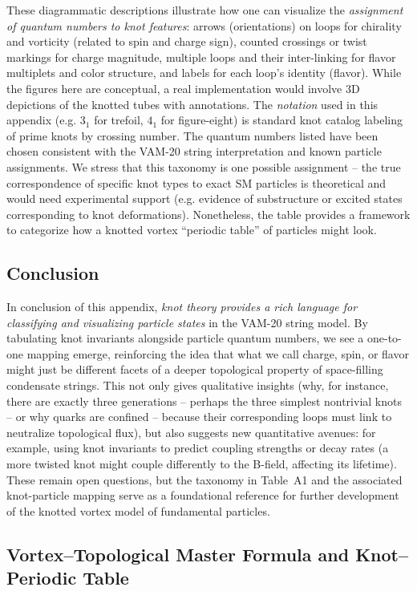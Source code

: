 \documentclass[12pt]{article}
\begin{document}
These diagrammatic descriptions illustrate how one can visualize the \emph{assignment of quantum numbers to knot features}: arrows (orientations) on loops for chirality and vorticity (related to spin and charge sign), counted crossings or twist markings for charge magnitude, multiple loops and their inter-linking for flavor multiplets and color structure, and labels for each loop’s identity (flavor). While the figures here are conceptual, a real implementation would involve 3D depictions of the knotted tubes with annotations. The \emph{notation} used in this appendix (e.g. $3_1$ for trefoil, $4_1$ for figure-eight) is standard knot catalog labeling of prime knots by crossing number\cite{mi.sanu.ac.rs}. The quantum numbers listed have been chosen consistent with the VAM-20 string interpretation and known particle assignments. We stress that this taxonomy is one possible assignment – the true correspondence of specific knot types to exact SM particles is theoretical and would need experimental support (e.g. evidence of substructure or excited states corresponding to knot deformations). Nonetheless, the table provides a framework to categorize how a knotted vortex “periodic table” of particles might look.

\subsection*{Conclusion}
In conclusion of this appendix, \emph{knot theory provides a rich language for classifying and visualizing particle states} in the VAM-20 string model. By tabulating knot invariants alongside particle quantum numbers, we see a one-to-one mapping emerge, reinforcing the idea that what we call charge, spin, or flavor might just be different facets of a deeper topological property of space-filling condensate strings. This not only gives qualitative insights (why, for instance, there are exactly three generations – perhaps the three simplest nontrivial knots – or why quarks are confined – because their corresponding loops must link to neutralize topological flux), but also suggests new quantitative avenues: for example, using knot invariants to predict coupling strengths or decay rates (a more twisted knot might couple differently to the B-field, affecting its lifetime). These remain open questions, but the taxonomy in Table~A1 and the associated knot-particle mapping serve as a foundational reference for further development of the knotted vortex model of fundamental particles.


\subsection{Vortex--Topological Master Formula and Knot--Periodic Table}
\end{document}
